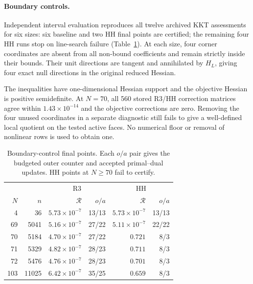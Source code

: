 \documentclass[pdflatex,sn-mathphys-num]{sn-jnl}
\theoremstyle{thmstyleone}
\theoremstyle{thmstylethree}
\begin{document}
\paragraph{Boundary controls.}
Independent interval evaluation reproduces all twelve archived KKT assessments
for six sizes: six baseline and two HH final points are certified; the remaining
four HH runs stop on line-search failure
(Table~\ref{tab:boundary-diagnostic}). At each size, four corner coordinates
are absent from all non-bound coefficients and remain strictly inside their
bounds. Their unit directions are tangent and annihilated by $H_L$, giving
four exact null directions in the original reduced Hessian.

The inequalities have one-dimensional Hessian support and the objective
Hessian is positive semidefinite. At $N=70$, all 560 stored R3/HH correction
matrices agree within $1.43\times10^{-14}$ and the objective corrections are
zero. Removing the four unused coordinates in a separate diagnostic still
fails to give a well-defined local quotient on the tested active faces.
No numerical floor or removal of nonlinear rows is used to obtain one.

\begin{table}[!htbp]
\centering\small
\caption{Boundary-control final points. Each $o/a$ pair gives the budgeted outer
counter and accepted primal--dual updates. HH points at $N\ge70$ fail to
certify.}
\label{tab:boundary-diagnostic}

\begin{tabular}{rrrrrr}
\toprule
& & \multicolumn{2}{c}{R3} & \multicolumn{2}{c}{HH} \\
$N$ & $n$ & $\mathcal R$ & $o/a$ & $\mathcal R$ & $o/a$ \\
\midrule
4 & 36 & $5.73\times10^{-7}$ & 13/13 & $5.73\times10^{-7}$ & 13/13 \\
69 & 5041 & $5.16\times10^{-7}$ & 27/22 & $5.11\times10^{-7}$ & 22/22 \\
70 & 5184 & $4.70\times10^{-7}$ & 27/22 & $0.721$ & 8/3 \\
71 & 5329 & $4.82\times10^{-7}$ & 28/23 & $0.711$ & 8/3 \\
72 & 5476 & $4.76\times10^{-7}$ & 28/23 & $0.701$ & 8/3 \\
103 & 11025 & $6.42\times10^{-7}$ & 35/25 & $0.659$ & 8/3 \\
\bottomrule
\end{tabular}


\end{table}
\end{document}
